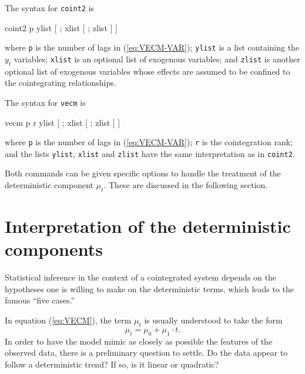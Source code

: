 The syntax for \texttt{coint2} is 
\begin{code}
  coint2 p ylist [ ; xlist [ ; zlist ] ]
\end{code}
where \texttt{p} is the number of lags in (\ref{eq:VECM-VAR});
\texttt{ylist} is a list containing the $y_t$ variables;
\texttt{xlist} is an optional list of exogenous variables; and
\texttt{zlist} is another optional list of exogenous variables whose
effects are assumed to be confined to the cointegrating relationships.

The syntax for \texttt{vecm} is 
\begin{code}
  vecm p r ylist [ ; xlist [ ; zlist ] ]
\end{code}
where \texttt{p} is the number of lags in (\ref{eq:VECM-VAR});
\texttt{r} is the cointegration rank; and the lists
\texttt{ylist}, \texttt{xlist} and \texttt{zlist} have the
same interpretation as in \texttt{coint2}.

Both commands can be given specific options to handle the treatment of
the deterministic component $\mu_t$. These are discussed in the
following section.

\section{Interpretation of the deterministic components}
\label{sec:coint-5cases}

Statistical inference in the context of a cointegrated system depends
on the hypotheses one is willing to make on the deterministic terms,
which leads to the famous ``five cases.''

In equation (\ref{eq:VECM}), the term $\mu_t$ is usually understood to
take the form
\[
  \mu_t = \mu_0 + \mu_1 \cdot t .
\]
In order to have the model mimic as closely as possible the features
of the observed data, there is a preliminary question to settle. Do
the data appear to follow a deterministic trend?  If so, is it
linear or quadratic?

